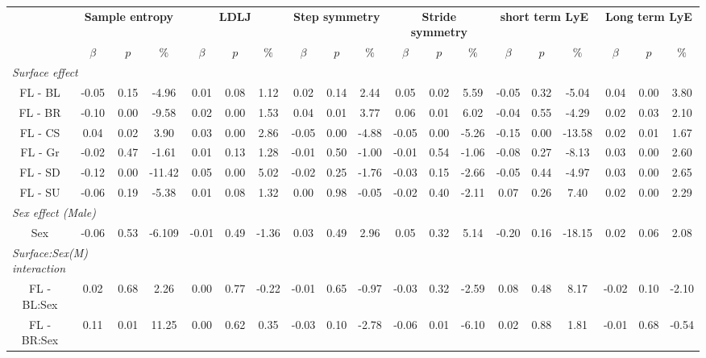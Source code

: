 \documentclass[authoryear,preprint,review,12pt]{elsarticle}
\begin{document}
{\begin{landscape}
\begin{table}[t]
    \scriptsize
    \centering
    \begin{tabular}{cccc|ccc|ccc|ccc|ccc|ccc}
            & \multicolumn{3}{c|}{\textbf{Sample entropy}} & \multicolumn{3}{c|}{\textbf{LDLJ}} & \multicolumn{3}{c|}{\textbf{Step symmetry}} & \multicolumn{3}{c|}{\textbf{Stride symmetry}} & \multicolumn{3}{c|}{\textbf{short term LyE}} & \multicolumn{3}{c}{\textbf{Long term LyE}}\\ 
            &  		$\beta$	&    $p$	&   $\%$	& $\beta$	&$p$	&$\%$	& $\beta$	&$p$	&$\%$	&$\beta$	&$p$	&$\%$	&$\beta$	&$p$	&$\%$ 	&$\beta$	&$p$	&$\%$\\ \hline
            \multicolumn{3}{l}{\textit{Surface effect}}																			\\
        FL - BL	&	-0.05	&0.15&	-4.96&	0.01&	0.08&	1.12&	0.02&	0.14&	2.44&	0.05&	0.02&	5.59&	-0.05&	0.32&	-5.04&	0.04&	0.00&	3.80\\
        FL - BR	&   -0.10&	{0.00}	&-9.58&	0.02&	0.00&	1.53&	0.04&	0.01&	3.77&	0.06&	0.01&	6.02&	-0.04&	0.55&	-4.29&	0.02&	0.03&	2.10\\
        FL - CS	&	0.04	&{0.02}&	3.90&	0.03&	0.00&	2.86&	-0.05&	0.00&	-4.88&	-0.05&	0.00&	-5.26&	-0.15&	0.00&	-13.58&	0.02&	0.01&	1.67\\
        FL - Gr	&	-0.02	&0.47&	-1.61&	0.01&	0.13&	1.28&	-0.01&	0.50&	-1.00&	-0.01&	0.54&	-1.06&	-0.08&	0.27&	-8.13&	0.03&	0.00&	2.60\\
        FL - SD	&	-0.12&	{0.00}&	-11.42&	0.05&	0.00&	5.02&	-0.02&	0.25&	-1.76&	-0.03&	0.15&	-2.66&	-0.05&	0.44&	-4.97&	0.03&	0.00&	2.65\\
        FL - SU	&	-0.06&	0.19&	-5.38&	0.01&	0.08&	1.32&	0.00&	0.98&	-0.05&	-0.02&	0.40&	-2.11&	0.07&	0.26&	7.40&	0.02&	0.00&	2.29\\
        \multicolumn{3}{l}{\textit{Sex effect (Male)}}								\\											
        Sex	&	-0.06&	0.53&	-6.109&	-0.01&	0.49&	-1.36&	0.03&	0.49&	2.96&	0.05&	0.32&	5.14&	-0.20&	0.16&	-18.15&	0.02&	0.06&	2.08\\
        \multicolumn{2}{l}{\textit{Surface:Sex(M) interaction}}	\\																		
        FL - BL:Sex	&	0.02&	0.68&	2.26&	0.00&	0.77&	-0.22&	-0.01&	0.65&	-0.97&	-0.03&	0.32&	-2.59&	0.08&	0.48&	8.17&	-0.02&	0.10&	-2.10\\
        FL - BR:Sex	&	0.11&	0.01&	11.25&	0.00&	0.62&	0.35&	-0.03&	0.10&	-2.78&	-0.06&	0.01&	-6.10&	0.02&	0.88&	1.81&	-0.01&	0.68&	-0.54\\

\end{tabular}
\end{table}
\end{landscape}}
\end{document}
